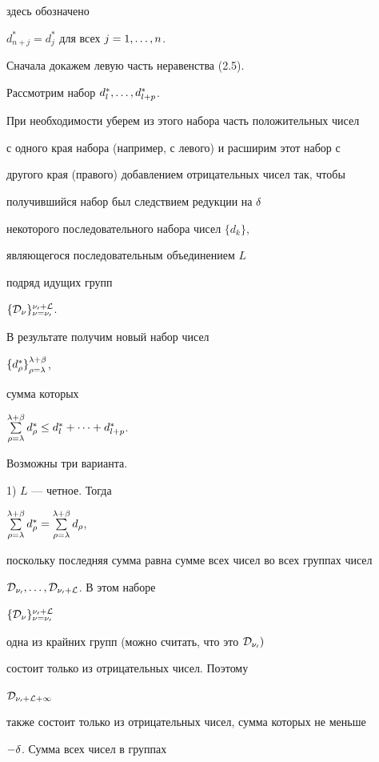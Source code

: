 \begin{pf}
здесь обозначено


$d^*_{n+j}=d^*_j$ для всех $j=1,\dotsc,n$.


Сначала докажем левую часть неравенства (2.5).





Рассмотрим набор $d_l^*,\dotsc,d^*_{l+p}$.


При необходимости уберем из этого набора часть положительных чисел


с одного края набора (например, с левого) и расширим этот набор с


другого края (правого) добавлением отрицательных чисел так, чтобы


получившийся набор был следствием редукции на $\delta$


некоторого последовательного набора чисел $\{d_k\}$,


являющегося последовательным объединением $L$


подряд идущих групп


$\{\cal D_{\nu}\}_{\nu=\nu_0}^{\nu_0+L}$.


В результате получим новый набор чисел


${\{d_{\rho}^*\}}_{\rho=\lambda}^{\lambda+\beta}$,


сумма которых


$\sum\limits_{\rho=\lambda}^{\lambda+\beta}d_{\rho}^* \le d_l^*+ \dotsb + d_{l+p}^*$.


Возможны три варианта.





1) $L$ --- четное. Тогда


$\sum\limits_{\rho=\la}^{\la+\beta}d_{\rho}^*=\sum\limits


_{\rho=\la}^{\la+\beta}d_{\rho}$,


поскольку последняя сумма равна сумме всех чисел во всех группах чисел


$\cal D_{\nu_0}, \dotsc, \cal D_{\nu_0+L}$. В этом наборе


$\{\cal D_{\nu}\}_{\nu=\nu_0}^{\nu_0+L}$


одна из крайних групп (можно считать, что это $\cal D_{\nu_0})$


состоит только из отрицательных чисел. Поэтому


$\cal D_{\nu_0+L+1}$


также состоит только из отрицательных чисел, сумма которых не меньше


$-\delta$. Сумма всех чисел в группах



\end{pf}
